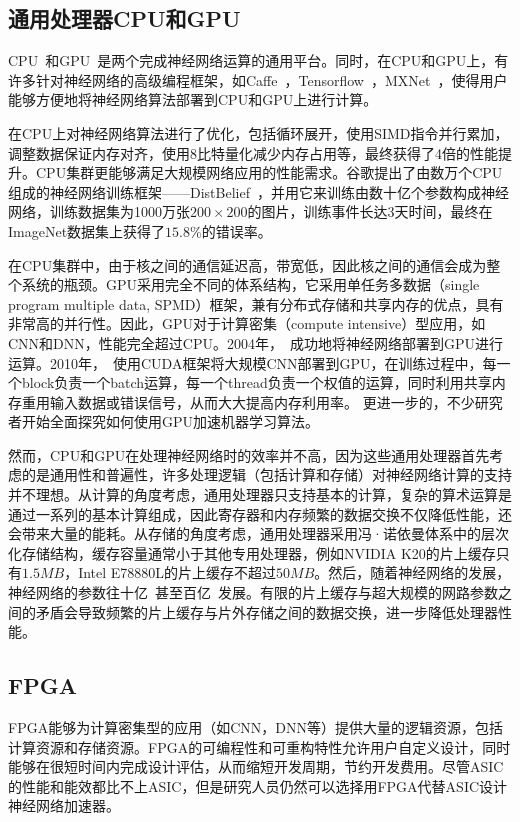 \subsection{通用处理器CPU和GPU}
CPU~\cite{chakradhar2010dynamically, vanhoucke2011improving}和GPU~\cite{farabet2009cnp, scherer2010accelerating, ciresan2011flexible, coates2013deep}是两个完成神经网络运算的通用平台。同时，在CPU和GPU上，有许多针对神经网络的高级编程框架，如Caffe~\cite{jia2014caffe}，Tensorflow~\cite{abadi2016tensorflow}，MXNet~\cite{chen2015mxnet}，使得用户能够方便地将神经网络算法部署到CPU和GPU上进行计算。

\citet{vanhoucke2011improving}在CPU上对神经网络算法进行了优化，包括循环展开，使用SIMD指令并行累加，调整数据保证内存对齐，使用8比特量化减少内存占用等，最终获得了4倍的性能提升。CPU集群更能够满足大规模网络应用的性能需求。谷歌提出了由数万个CPU组成的神经网络训练框架——DistBelief~\cite{dean2012large}，并用它来训练由数十亿个参数构成神经网络，训练数据集为1000万张$200\times 200$的图片，训练事件长达3天时间，最终在ImageNet数据集上获得了$15.8\%$的错误率。

在CPU集群中，由于核之间的通信延迟高，带宽低，因此核之间的通信会成为整个系统的瓶颈。GPU采用完全不同的体系结构，它采用单任务多数据（single program multiple data, SPMD）框架，兼有分布式存储和共享内存的优点，具有非常高的并行性。因此，GPU对于计算密集（compute intensive）型应用，如CNN和DNN，性能完全超过CPU。2004年，~\citet{oh2004gpu}成功地将神经网络部署到GPU进行运算。2010年，~\citet{scherer2010accelerating}使用CUDA框架将大规模CNN部署到GPU，在训练过程中，每一个block负责一个batch运算，每一个thread负责一个权值的运算，同时利用共享内存重用输入数据或错误信号，从而大大提高内存利用率。
更进一步的，不少研究者开始全面探究如何使用GPU加速机器学习算法。

然而，CPU和GPU在处理神经网络时的效率并不高，因为这些通用处理器首先考虑的是通用性和普遍性，许多处理逻辑（包括计算和存储）对神经网络计算的支持并不理想。从计算的角度考虑，通用处理器只支持基本的计算，复杂的算术运算是通过一系列的基本计算组成，因此寄存器和内存频繁的数据交换不仅降低性能，还会带来大量的能耗。从存储的角度考虑，通用处理器采用冯·诺依曼体系中的层次化存储结构，缓存容量通常小于其他专用处理器，例如NVIDIA K20的片上缓存只有$1.5MB$，Intel E78880L的片上缓存不超过$50MB$。然后，随着神经网络的发展，神经网络的参数往十亿~\cite{le2013building}甚至百亿~\cite{coates2013deep}发展。有限的片上缓存与超大规模的网路参数之间的矛盾会导致频繁的片上缓存与片外存储之间的数据交换，进一步降低处理器性能。

\subsection{FPGA}
FPGA能够为计算密集型的应用（如CNN，DNN等）提供大量的逻辑资源，包括计算资源和存储资源。FPGA的可编程性和可重构特性允许用户自定义设计，同时能够在很短时间内完成设计评估，从而缩短开发周期，节约开发费用。尽管ASIC的性能和能效都比不上ASIC，但是研究人员仍然可以选择用FPGA代替ASIC设计神经网络加速器。

